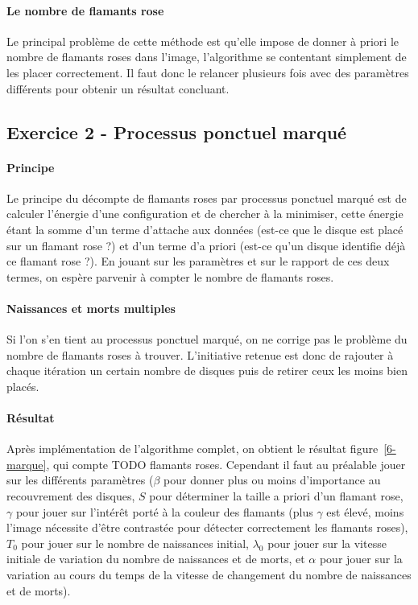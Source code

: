 \begin{figure}
\end{figure}

\paragraph{Le nombre de flamants rose}
Le principal problème de cette méthode est qu'elle impose de donner à priori le nombre de flamants roses dans l'image, l'algorithme se contentant simplement de les placer correctement. Il faut donc le relancer plusieurs fois avec des paramètres différents pour obtenir un résultat concluant.

\subsection{Exercice 2 - Processus ponctuel marqué}
\paragraph{Principe}
Le principe du décompte de flamants roses par processus ponctuel marqué est de calculer l'énergie d'une configuration et de chercher à la minimiser, cette énergie étant la somme d'un terme d'attache aux données (est-ce que le disque est placé sur un flamant rose ?) et d'un terme d'a priori (est-ce qu'un disque identifie déjà ce flamant rose ?). En jouant sur les paramètres et sur le rapport de ces deux termes, on espère parvenir à compter le nombre de flamants roses.

\paragraph{Naissances et morts multiples}
Si l'on s'en tient au processus ponctuel marqué, on ne corrige pas le problème du nombre de flamants roses à trouver. L'initiative retenue est donc de rajouter à chaque itération un certain nombre de disques puis de retirer ceux les moins bien placés.

\paragraph{Résultat}
Après implémentation de l'algorithme complet, on obtient le résultat figure~\ref{6-marque}, qui compte TODO flamants roses. Cependant il faut au préalable jouer sur les différents paramètres ($\beta$ pour donner plus ou moins d'importance au recouvrement des disques, $S$ pour déterminer la taille a priori d'un flamant rose, $\gamma$ pour jouer sur l'intérêt porté à la couleur des flamants (plus $\gamma$ est élevé, moins l'image nécessite d'être contrastée pour détecter correctement les flamants roses), $T_0$ pour jouer sur le nombre de naissances initial, $\lambda_0$ pour jouer sur la vitesse initiale de variation du nombre de naissances et de morts, et $\alpha$ pour jouer sur la variation au cours du temps de la vitesse de changement du nombre de naissances et de morts).

\begin{figure}
\end{figure}
